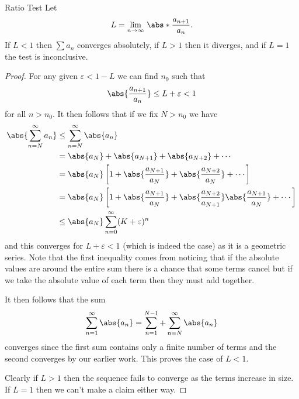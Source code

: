 \documentclass[fleqn]{NotesClass}
\begin{document}
    \begin{lma}{Ratio Test}{}
        Let
        \begin{equation}
            L = \lim_{n\to\infty} \, \abs*{\frac{a_{n+1}}{a_n}}.
        \end{equation}
        If \(L < 1\) then \(\sum a_n\) converges absolutely, if \(L > 1\) then it diverges, and if \(L = 1\) the test is inconclusive.
        
        \begin{proof}
            For any given \(\varepsilon < 1 - L\) we can find \(n_9\) such that
            \begin{equation}
                \abs{\frac{a_{n+1}}{a_n}} \le L + \varepsilon < 1
            \end{equation}
            for all \(n > n_0\).
            It then follows that if we fix \(N > n_0\) we have
            \begin{align}
                \abs{\sum_{n=N}^{\infty} a_n} &\le \sum_{n=N}^{\infty} \abs{a_n}\\
                &= \abs{a_N} + \abs{a_{N+1}} + \abs{a_{N+2}} + \dotsb\\
                &= \abs{a_N}\left[ 1 + \abs{\frac{a_{N+1}}{a_N}} + \abs{\frac{a_{N+2}}{a_{N}}} + \dotsb \right]\\
                &= \abs{a_N} \left[ 1 + \abs{\frac{a_{N+1}}{a_N}} + \abs{\frac{a_{N+2}}{a_{N+1}}}\abs{\frac{a_{N+1}}{a_N}} + \dotsb \right]\\
                &\le \abs{a_N} \sum_{n=0}^{\infty} (K + \varepsilon)^{n}
            \end{align}
            and this converges for \(L + \varepsilon < 1\) (which is indeed the case) as it is a geometric series.
            Note that the first inequality comes from noticing that if the absolute values are around the entire sum there is a chance that some terms cancel but if we take the absolute value of each term then they must add together.
            
            It then follows that the sum
            \begin{equation}
                \sum_{n=1}^{\infty} \abs{a_n} = \sum_{n=1}^{N-1} + \sum_{n=N}^{\infty} \abs{a_n}
            \end{equation}
            converges since the first sum contains only a finite number of terms and the second converges by our earlier work.
            This proves the case of \(L < 1\).
            
            Clearly if \(L > 1\) then the sequence fails to converge as the terms increase in size.
            If \(L = 1\) then we can't make a claim either way.
        \end{proof}
    \end{lma}
    
\end{document}
